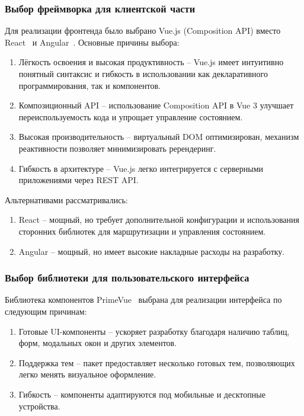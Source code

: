 \subsubsection{Выбор фреймворка для клиентской части}

Для реализации фронтенда было выбрано Vue.js (Composition API) вместо React~\cite{Framework:React} и Angular~\cite{Framework:Angular}. Основные причины выбора:
\begin{enumerate}
    \item Лёгкость освоения и высокая продуктивность -- Vue.js имеет интуитивно понятный синтаксис и гибкость в использовании как декларативного программирования, так и компонентов.
    \item Композиционный API -- использование Composition API в Vue 3 улучшает переиспользуемость кода и упрощает управление состоянием.
    \item Высокая производительность -- виртуальный DOM оптимизирован, механизм реактивности позволяет минимизировать ререндеринг.
    \item Гибкость в архитектуре -- Vue.js легко интегрируется с серверными приложениями через REST API.
\end{enumerate}

Альтернативами рассматривались:
\begin{enumerate}
    \item React -- мощный, но требует дополнительной конфигурации и использования сторонних библиотек для маршрутизации и управления состоянием.
    \item Angular -- мощный, но имеет высокие накладные расходы на разработку.
\end{enumerate}

\subsubsection{Выбор библиотеки для пользовательского интерфейса}

Библиотека компонентов PrimeVue~\cite{Framework:PrimeVue} выбрана для реализации интерфейса по следующим причинам:
\begin{enumerate}
    \item Готовые UI-компоненты -- ускоряет разработку благодаря наличию таблиц, форм, модальных окон и других элементов.
    \item Поддержка тем -- пакет предоставляет несколько готовых тем, позволяющих легко менять визуальное оформление.
    \item Гибкость -- компоненты адаптируются под мобильные и десктопные устройства.
\end{enumerate}

